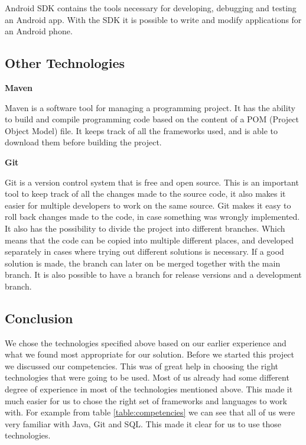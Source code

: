 Android SDK contains the tools necessary for developing, debugging and testing an Android app.
With the SDK it is possible to write and modify applications for an Android phone.

\subsection{Other Technologies}

\textbf{Maven} \nocite{Maven}

Maven is a software tool for managing a programming project.
It has the ability to build and compile programming code based on the content of a POM (Project Object Model) file.
It keeps track of all the frameworks used, and is able to download them before building the project.

\textbf{Git} \nocite{Git}

Git is a version control system that is free and open source.
This is an important tool to keep track of all the changes made to the source code, it also makes it easier for multiple developers to work on the same source.
Git makes it easy to roll back changes made to the code, in case something was wrongly implemented.
It also has the possibility to divide the project into different branches.
Which means that the code can be copied into multiple different places, and developed separately in cases where trying out different solutions is necessary.
If a good solution is made, the branch can later on be merged together with the main branch.
It is also possible to have a branch for release versions and a development branch.

\subsection{Conclusion}

We chose the technologies specified above based on our earlier experience and what we found most appropriate for our solution.
Before we started this project we discussed our competencies.
This was of great help in choosing the right technologies that were going to be used.
Most of us already had some different degree of experience in most of the technologies mentioned above.
This made it much easier for us to chose the right set of frameworks and languages to work with.
For example from table \ref{table:competencies} we can see that all of us were very familiar with Java, Git and SQL.
This made it clear for us to use those technologies.

